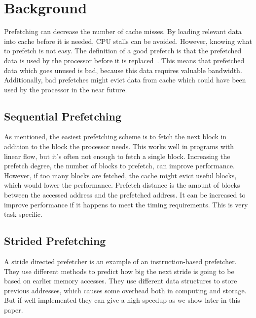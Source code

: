 \section{Background} %



Prefetching can decrease the number of cache misses. By loading
relevant data into cache before it is needed, CPU stalls can be
avoided. However, knowing what to prefetch is not easy. The definition
of a good prefetch is that the prefetched data is used by the
processor before it is
replaced~\cite{srinivasan_davidson_tyson_2004}. This means that
prefetched data which goes unused is bad, because this data requires
valuable bandwidth. Additionally, bad prefetches might evict data from
cache which could have been used by the processor in the near future.

\subsection{Sequential Prefetching}

As mentioned, the easiest prefetching scheme is to fetch the next
block in addition to the block the processor needs. This works well in
programs with linear flow, but it's often not enough to fetch a single
block. Increasing the prefetch degree, the number of blocks to
prefetch, can improve performance. However, if too many blocks are
fetched, the cache might evict useful blocks, which would lower the
performance. Prefetch distance is the amount of blocks between the
accessed address and the prefetched address. It can be increased to
improve performance if it happens to meet the timing requirements.
This is very task specific. 

\subsection{Strided Prefetching}

A stride directed prefetcher is an example of an instruction-based
prefetcher. They use different methods to predict how big the next
stride is going to be based on earlier memory accesses. They use
different data structures to store previous addresses, which causes
some overhead both in computing and storage. But if well implemented
they can give a high speedup as we show later in this paper.
